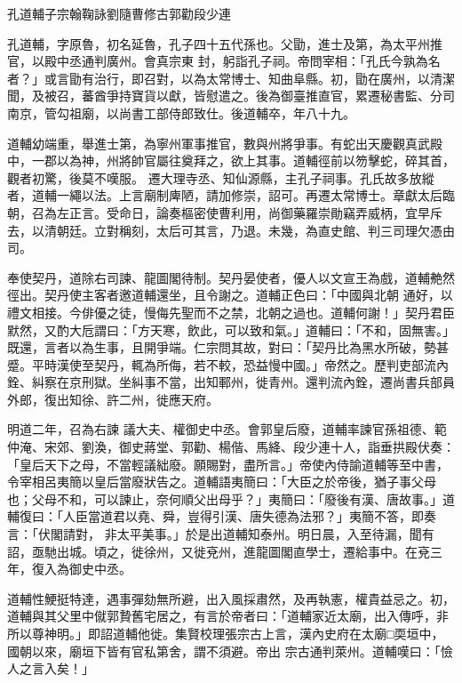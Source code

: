 
\begin{pinyinscope}

 孔道輔子宗翰鞠詠劉隨曹修古郭勸段少連



 孔道輔，字原魯，初名延魯，孔子四十五代孫也。父勖，進士及第，為太平州推官，以殿中丞通判廣州。會真宗東
 封，躬詣孔子祠。帝問宰相：「孔氏今孰為名者？」或言勖有治行，即召對，以為太常博士、知曲阜縣。初，勖在廣州，以清潔聞，及被召，蕃酋爭持寶貨以獻，皆慰遣之。後為御臺推直官，累遷秘書監、分司南京，管勾祖廟，以尚書工部侍郎致仕。後道輔卒，年八十九。



 道輔幼端重，舉進士第，為寧州軍事推官，數與州將爭事。有蛇出天慶觀真武殿中，一郡以為神，州將帥官屬往奠拜之，欲上其事。道輔徑前以笏擊蛇，碎其首，觀者初驚，後莫不嘆服。
 遷大理寺丞、知仙源縣，主孔子祠事。孔氏故多放縱者，道輔一繩以法。上言廟制庳陋，請加修崇，詔可。再遷太常博士。章獻太后臨朝，召為左正言。受命日，論奏樞密使曹利用，尚御藥羅崇勛竊弄威柄，宜早斥去，以清朝廷。立對稱刻，太后可其言，乃退。未幾，為直史館、判三司理欠憑由司。



 奉使契丹，道除右司諫、龍圖閣待制。契丹晏使者，優人以文宣王為戲，道輔艴然徑出。契丹使主客者邀道輔還坐，且令謝之。道輔正色曰：「中國與北朝
 通好，以禮文相接。今俳優之徒，慢侮先聖而不之禁，北朝之過也。道輔何謝！」契丹君臣默然，又酌大卮謂曰：「方天寒，飲此，可以致和氣。」道輔曰：「不和，固無害。」既還，言者以為生事，且開爭端。仁宗問其故，對曰：「契丹比為黑水所破，勢甚蹙。平時漢使至契丹，輒為所侮，若不較，恐益慢中國。」帝然之。歷判吏部流內銓、糾察在京刑獄。坐糾事不當，出知鄆州，徙青州。還判流內銓，遷尚書兵部員外郎，復出知徐、許二州，徙應天府。



 明道二年，召為右諫
 議大夫、權御史中丞。會郭皇后廢，道輔率諫官孫祖德、範仲淹、宋郊、劉渙，御史蔣堂、郭勸、楊偕、馬絳、段少連十人，詣垂拱殿伏奏：「皇后天下之母，不當輕議絀廢。願賜對，盡所言。」帝使內侍諭道輔等至中書，令宰相呂夷簡以皇后當廢狀告之。道輔語夷簡曰：「大臣之於帝後，猶子事父母也；父母不和，可以諫止，奈何順父出母乎？」夷簡曰：「廢後有漢、唐故事。」道輔復曰：「人臣當道君以堯、舜，豈得引漢、唐失德為法邪？」夷簡不答，即奏言：「伏閣請對，
 非太平美事。」於是出道輔知泰州。明日晨，入至待漏，聞有詔，亟馳出城。頃之，徙徐州，又徙兗州，進龍圖閣直學士，遷給事中。在兗三年，復入為御史中丞。



 道輔性鯁挺特達，遇事彈劾無所避，出入風採肅然，及再執憲，權貴益忌之。初，道輔與其父里中僦郭贄舊宅居之，有言於帝者曰：「道輔家近太廟，出入傳呼，非所以尊神明。」即詔道輔他徙。集賢校理張宗古上言，漢內史府在太廟□耎垣中，國朝以來，廟垣下皆有官私第舍，謂不須避。帝出
 宗古通判萊州。道輔嘆曰：「憸人之言入矣！」




\end{pinyinscope}
